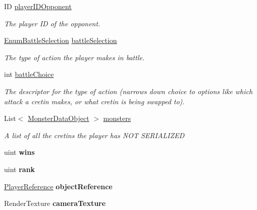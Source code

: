 \begin{DoxyCompactItemize}
\item 
I\-D \hyperlink{struct_game_state_1_1_player_aaed188c94b7f6be4dabe39744aa818ca}{player\-I\-D\-Opponent}
\begin{DoxyCompactList}\small\item\em The player I\-D of the opponent. \end{DoxyCompactList}\item 
\hyperlink{struct_game_state_1_1_player_a9f54c5eca1e60acbaa2074e981f51615}{Enum\-Battle\-Selection} \hyperlink{struct_game_state_1_1_player_a123c8ee2ef6e66e88bcca1a80f73ab4a}{battle\-Selection}
\begin{DoxyCompactList}\small\item\em The type of action the player makes in battle. \end{DoxyCompactList}\item 
int \hyperlink{struct_game_state_1_1_player_a3bfa8ea6e2067982474dc4f6073061c5}{battle\-Choice}
\begin{DoxyCompactList}\small\item\em The descriptor for the type of action (narrows down choice to options like which attack a cretin makes, or what cretin is being swapped to). \end{DoxyCompactList}\item 
List$<$ \hyperlink{class_monster_data_object}{Monster\-Data\-Object} $>$ \hyperlink{struct_game_state_1_1_player_a4412b3835e68a55b00610438118cdb16}{monsters}
\begin{DoxyCompactList}\small\item\em A list of all the cretins the player has N\-O\-T S\-E\-R\-I\-A\-L\-I\-Z\-E\-D \end{DoxyCompactList}\item 
\hypertarget{struct_game_state_1_1_player_a3a4d13459cad9bd58e058ddc6387af70}{uint {\bfseries wins}}\label{struct_game_state_1_1_player_a3a4d13459cad9bd58e058ddc6387af70}

\item 
\hypertarget{struct_game_state_1_1_player_a6cf0778cc27a824eac211b8b29b3dfcc}{uint {\bfseries rank}}\label{struct_game_state_1_1_player_a6cf0778cc27a824eac211b8b29b3dfcc}

\item 
\hypertarget{struct_game_state_1_1_player_aebf24de01e14055dc940d0493753484f}{\hyperlink{class_player_reference}{Player\-Reference} {\bfseries object\-Reference}}\label{struct_game_state_1_1_player_aebf24de01e14055dc940d0493753484f}

\item 
\hypertarget{struct_game_state_1_1_player_ac1f7e0b5bc335c32c3be71e3653787a6}{Render\-Texture {\bfseries camera\-Texture}}\label{struct_game_state_1_1_player_ac1f7e0b5bc335c32c3be71e3653787a6}


\end{DoxyCompactItemize}
